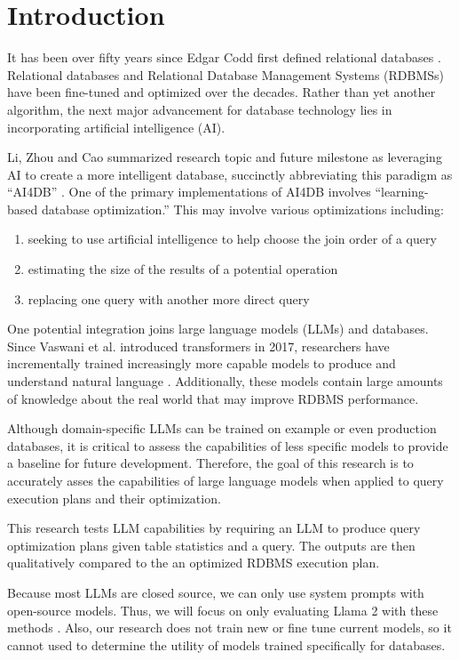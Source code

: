 \section{Introduction}
It has been over fifty years since Edgar Codd first defined relational databases \cite{codd1970}. Relational databases and Relational Database Management Systems (RDBMSs) have been fine-tuned and optimized over the decades. Rather than yet another algorithm, the next major advancement for database technology lies in incorporating artificial intelligence (AI).

Li, Zhou and Cao summarized research topic and future milestone as leveraging AI to create a more intelligent database, succinctly abbreviating this paradigm as ``AI4DB'' \cite{li2021}. One of the primary implementations of AI4DB involves ``learning-based database optimization.'' This may involve various optimizations including:

\begin{enumerate}
  \item seeking to use artificial intelligence to help choose the join order of a query
  \item estimating the size of the results of a potential operation
  \item replacing one query with another more direct query
\end{enumerate}

One potential integration joins large language models (LLMs) and databases. Since Vaswani et al. introduced transformers in 2017, researchers have incrementally trained increasingly more capable models to produce and understand natural language \cite{vaswani2017}. Additionally, these models contain large amounts of knowledge about the real world that may improve RDBMS performance.

Although domain-specific LLMs can be trained on example or even production databases, it is critical to assess the capabilities of less specific models to provide a baseline for future development. Therefore, the goal of this research is to accurately asses the capabilities of large language models when applied to query execution plans and their optimization.

This research tests LLM capabilities by requiring an LLM to produce query optimization plans given table statistics and a query. The outputs are then qualitatively compared to the an optimized RDBMS execution plan.

Because most LLMs are closed source, we can only use system prompts with open-source models. Thus, we will focus on only evaluating Llama 2 with these methods \cite{touvron2023}. Also, our research does not train new or fine tune current models, so it cannot used to determine the utility of models trained specifically for databases.


